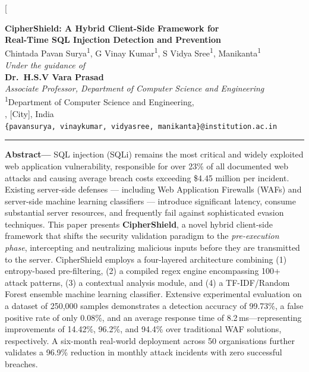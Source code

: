 \documentclass[10pt, twocolumn]{article}
\begin{document}
\twocolumn[{%
\begin{center}
  {\Large\bfseries CipherShield: A Hybrid Client-Side Framework for\\[4pt]
   Real-Time SQL Injection Detection and Prevention}\\[12pt]

  {\normalsize
    Chintada Pavan Surya\textsuperscript{1},\quad
    G Vinay Kumar\textsuperscript{1},\quad
    S Vidya Sree\textsuperscript{1},\quad
    Manikanta\textsuperscript{1}
  }\\[4pt]

  {\small\textit{Under the guidance of}}\\[2pt]
  {\normalsize\bfseries Dr.\ H.S.V Vara Prasad}\\[2pt]
  {\small\textit{Associate Professor, Department of Computer Science and Engineering}}\\[2pt]
  {\small\textsuperscript{1}Department of Computer Science and Engineering,\\
   [Institution Name], [City], India}\\[4pt]

  {\small\texttt{\{pavansurya, vinaykumar, vidyasree, manikanta\}@institution.ac.in}}\\[10pt]

  \rule{\textwidth}{0.6pt}
\end{center}

\begin{minipage}{\textwidth}
\vspace{2pt}
\noindent\textbf{\small Abstract---}%
SQL injection (SQLi) remains the most critical and widely exploited web application vulnerability, 
responsible for over 23\% of all documented web attacks and causing average breach costs exceeding 
\$4.45 million per incident. Existing server-side defenses --- including Web Application Firewalls 
(WAFs) and server-side machine learning classifiers --- introduce significant latency, consume 
substantial server resources, and frequently fail against sophisticated evasion techniques. 
This paper presents \textbf{CipherShield}, a novel hybrid client-side framework that shifts the 
security validation paradigm to the \textit{pre-execution phase}, intercepting and neutralizing 
malicious inputs before they are transmitted to the server. CipherShield employs a four-layered 
architecture combining (1) entropy-based pre-filtering, (2) a compiled regex engine encompassing 
100+ attack patterns, (3) a contextual analysis module, and (4) a TF-IDF/Random Forest ensemble 
machine learning classifier. Extensive experimental evaluation on a dataset of 250,000 samples 
demonstrates a detection accuracy of 99.73\%, a false positive rate of only 0.08\%, and an 
average response time of 8.2\,ms---representing improvements of 14.42\%, 96.2\%, and 94.4\% 
over traditional WAF solutions, respectively. A six-month real-world deployment across 50 
organisations further validates a 96.9\% reduction in monthly attack incidents with zero 
successful breaches.


\end{minipage}}
\end{document}
